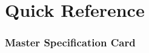 \documentclass[12pt,a4paper]{article}
\begin{document}
%
%

\part{Quick Reference}

\section{Master Specification Card}
\end{document}
